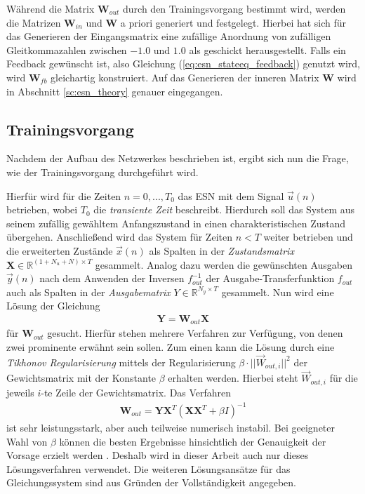 Während die Matrix $\mathbf{W}_{out}$ durch den Trainingsvorgang bestimmt wird, werden die Matrizen $\mathbf{W}_{in}$ und $\mathbf{W}$ a priori generiert und festgelegt. Hierbei hat sich für das Generieren der Eingangsmatrix eine zufällige Anordnung von zufälligen Gleitkommazahlen zwischen $-1.0$ und $1.0$ als geschickt herausgestellt. Falls ein Feedback gewünscht ist, also Gleichung (\ref{eq:esn_stateeq_feedback}) genutzt wird, wird $\mathbf{W}_{fb}$ gleichartig konstruiert. Auf das Generieren der inneren Matrix $\mathbf{W}$ wird in Abschnitt \ref{sc:esn_theory} genauer eingegangen.

\subsection{Trainingsvorgang}
Nachdem der Aufbau des Netzwerkes beschrieben ist, ergibt sich nun die Frage, wie der Trainingsvorgang durchgeführt wird.

Hierfür wird für die Zeiten $n=0, ..., T_0$ das \textsc{ESN} mit dem Signal $\vec{u}(n)$ betrieben, wobei $T_0$ die \textit{transiente Zeit} beschreibt. Hierdurch soll das System aus seinem zufällig gewähltem Anfangszustand in einen charakteristischen Zustand übergehen. Anschließend wird das System für Zeiten $n < T$ weiter betrieben und die erweiterten Zustände $\vec{x}(n)$ als Spalten in der \textit{Zustandsmatrix} $\mathbf{X} \in \mathbb{R}^{(1 + N_u + N) \times T}$ gesammelt. Analog dazu werden die gewünschten Ausgaben $\vec{y}(n)$ nach dem Anwenden der Inversen $f^{-1}_{out}$ der Ausgabe-Transferfunktion $f_{out}$ auch als Spalten in der \textit{Ausgabematrix} $Y \in \mathbb{R}^{N_y \times T}$ gesammelt.
Nun wird eine Lösung der Gleichung
\begin{align}
\mathbf{Y} = \mathbf{W}_{out} \mathbf{X}
\end{align}
für $\mathbf{W}_{out}$ gesucht. Hierfür stehen mehrere Verfahren zur Verfügung, von denen zwei prominente erwähnt sein sollen.
Zum einen kann die Lösung durch eine \textit{Tikhonov Regularisierung} mittels der Regularisierung $\beta \cdot ||\vec{W}_{out, i}||^2$ der Gewichtsmatrix mit der Konstante $\beta$ erhalten werden. Hierbei steht $\vec{W}_{out, i}$ für die jeweils $i$-te Zeile der Gewichtsmatrix. Das Verfahren
\begin{align}
\label{eq:tikhonov}
\mathbf{W}_{out} = \mathbf{Y} \mathbf{X}^T \left(\mathbf{X} \mathbf{X}^T + \beta I \right)^{-1}
\end{align}
ist sehr leistungsstark, aber auch teilweise numerisch instabil. Bei geeigneter Wahl von $\beta$ können die besten Ergebnisse hinsichtlich der Genauigkeit der Vorsage erzielt werden \cite{lukoseviciusa2009}. Deshalb wird in dieser Arbeit auch nur dieses Lösungsverfahren verwendet. Die weiteren Lösungsansätze für das Gleichungssystem sind aus Gründen der Vollständigkeit angegeben.\\

